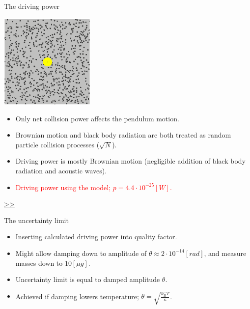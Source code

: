\documentclass{beamer}
\begin{document}
\begin{frame}{\hypertarget{frame:The driving power}{The driving power}}
	\begin{center}		
		\includegraphics[width=0.35\textwidth,keepaspectratio]{random_motion1.jpg}
	\end{center}


	\begin{itemize}	
		
		\item Only net collision power affects the pendulum motion.
		\item Brownian motion and black body radiation are both treated as random particle collision processes ($\sqrt{N}$).
		\item Driving power is mostly Brownian motion (negligible addition of black body radiation and acoustic waves). 
		\item \textcolor{red}{Driving power using the model; $p = 4.4\cdot 10^{-25}[W]$.}  	 
					
	\end{itemize}
	\hyperlink{frame:The driving power 1}{>>} 

\end{frame}


\begin{frame}{The uncertainty limit}
	
	\begin{itemize}
		\item Inserting calculated driving power into quality factor.
		\item Might allow damping down to amplitude of $\theta\approx 2\cdot 10^{-14}[rad]$, and measure masses down to $10[\mu g]$.
		\item Uncertainty limit is equal to damped amplitude $\theta$. 	
		\item Achieved if damping lowers temperature; $\theta = \sqrt{\frac{k_B T}{\kappa}}$.
				
	\end{itemize}
\end{frame}
\end{document}
